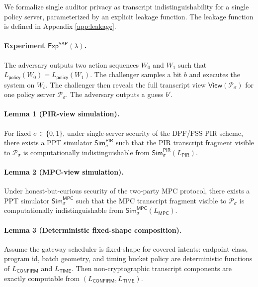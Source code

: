 We formalize single auditor privacy as transcript indistinguishability for a single policy server,
parameterized by an explicit leakage function.
The leakage function is defined in Appendix \ref{app:leakage}.

\paragraph{Experiment $\mathsf{Exp}^{\mathsf{SAP}}(\lambda)$.}
The adversary outputs two action sequences $W_0$ and $W_1$ such that
$L_{\mathsf{policy}}(W_0) = L_{\mathsf{policy}}(W_1)$.
The challenger samples a bit $b$ and executes the system on $W_b$.
The challenger then reveals the full transcript view $\mathsf{View}(\mathcal{P}_\sigma)$ for one
policy server $\mathcal{P}_\sigma$.
The adversary outputs a guess $b'$.

\paragraph{Lemma 1 (PIR-view simulation).}
For fixed $\sigma \in \{0,1\}$, under single-server security of the DPF/FSS PIR scheme, there exists
a PPT simulator $\mathsf{Sim}^{\mathsf{PIR}}_\sigma$ such that the PIR transcript fragment visible to
$\mathcal{P}_\sigma$ is computationally indistinguishable from
$\mathsf{Sim}^{\mathsf{PIR}}_\sigma(L_{\mathsf{PIR}})$.

\paragraph{Lemma 2 (MPC-view simulation).}
Under honest-but-curious security of the two-party MPC protocol, there exists a PPT simulator
$\mathsf{Sim}^{\mathsf{MPC}}_\sigma$ such that the MPC transcript fragment visible to
$\mathcal{P}_\sigma$ is computationally indistinguishable from
$\mathsf{Sim}^{\mathsf{MPC}}_\sigma(L_{\mathsf{MPC}})$.

\paragraph{Lemma 3 (Deterministic fixed-shape composition).}
Assume the gateway scheduler is fixed-shape for covered intents: endpoint class, program id, batch
geometry, and timing bucket policy are deterministic functions of
$L_{\mathsf{CONFIRM}}$ and $L_{\mathsf{TIME}}$.
Then non-cryptographic transcript components are exactly computable from
$(L_{\mathsf{CONFIRM}},L_{\mathsf{TIME}})$.

